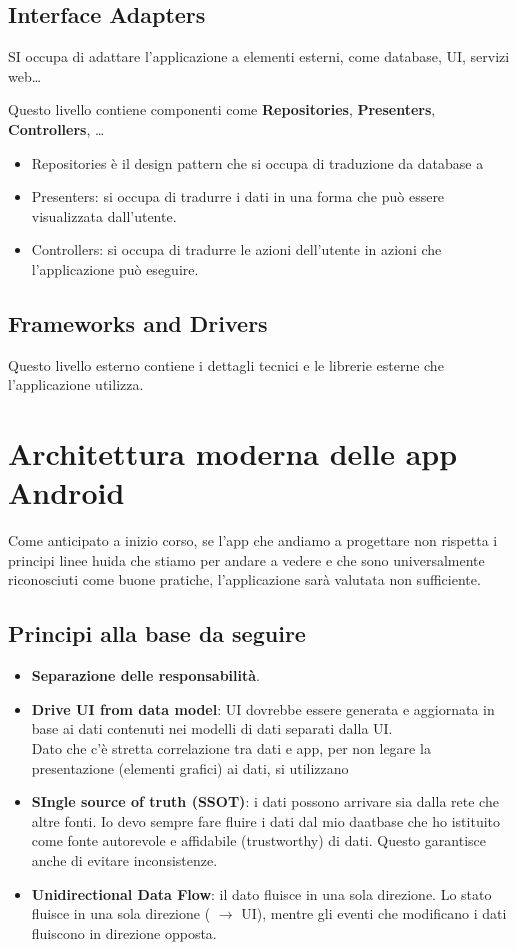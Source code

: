 \subsection{Interface Adapters}
\par SI occupa di adattare l'applicazione a elementi esterni, come database, UI, servizi web\dots
\par Questo livello contiene componenti come \textbf{Repositories}, \textbf{Presenters}, \textbf{Controllers}, \dots
\begin{itemize}
    \item Repositories è il design pattern che si occupa di traduzione da database a 
    \item Presenters: si occupa di tradurre i dati in una forma che può essere visualizzata dall'utente.
    \item Controllers: si occupa di tradurre le azioni dell'utente in azioni che l'applicazione può eseguire.
\end{itemize}

\subsection{Frameworks and Drivers}
\par Questo livello esterno contiene i dettagli tecnici e le librerie esterne che l'applicazione utilizza.


\section{Architettura moderna delle app Android}
\par Come anticipato a inizio corso, se l'app che andiamo a progettare non rispetta i principi linee huida che stiamo per andare a vedere e che sono universalmente riconosciuti come buone pratiche, l'applicazione sarà valutata non sufficiente.

\subsection{Principi alla base da seguire}
\begin{itemize}
    \item \textbf{Separazione delle responsabilità}.
    \item \textbf{Drive UI from data model}: UI dovrebbe essere generata e aggiornata in base ai dati contenuti nei modelli di dati separati dalla UI.\\
    Dato che c'è stretta correlazione tra dati e app, per non legare la presentazione (elementi grafici) ai dati, si utilizzano 
    \item \textbf{SIngle source of truth (SSOT)}: i dati possono arrivare sia dalla rete che altre fonti. Io devo sempre fare fluire i dati dal mio daatbase che ho istituito come fonte autorevole e affidabile (trustworthy) di dati. Questo garantisce anche di evitare inconsistenze.
    \item \textbf{Unidirectional Data Flow}: il dato fluisce in una sola direzione. Lo stato fluisce in una sola direzione ( $\rightarrow$ UI), mentre gli eventi che modificano i dati fluiscono in direzione opposta.
\end{itemize}

